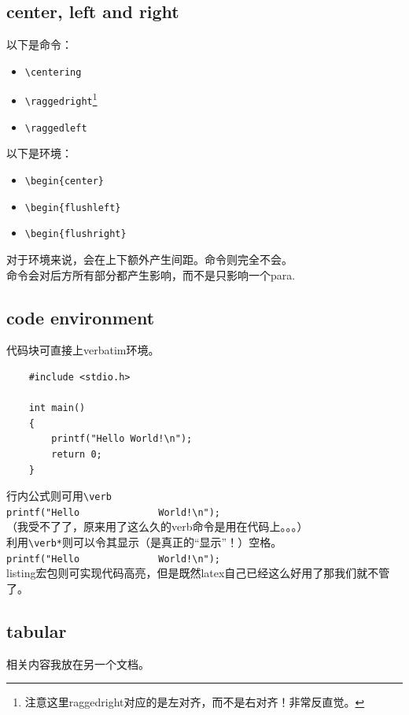 \documentclass{article}
\begin{document}
\subsection{center, left and right}
\noindent
以下是命令：
\begin{itemize}
    \item \verb|\centering|
    \item \verb|\raggedright|\footnote{注意这里raggedright对应的是左对齐，而不是右对齐！非常反直觉。}
    \item \verb|\raggedleft|
\end{itemize}
以下是环境：
\begin{itemize}
    \item \verb|\begin{center}|
    \item \verb|\begin{flushleft}|
    \item \verb|\begin{flushright}|
\end{itemize}
对于环境来说，会在上下额外产生间距。命令则完全不会。\\
命令会对后方所有部分都产生影响，而不是只影响一个para.
\subsection{code environment}
\noindent
代码块可直接上verbatim环境。
\begin{verbatim}
    #include <stdio.h>

    int main()
    {
        printf("Hello World!\n");
        return 0;
    }
\end{verbatim}
行内公式则可用\verb|\verb|\\
\verb|printf("Hello              World!\n");|\\
（我受不了了，原来用了这么久的verb命令是用在代码上。。。）\\
利用\verb|\verb*|则可以令其显示（是真正的“显示”！）空格。\\
\verb*|printf("Hello              World!\n");|\\
listing宏包则可实现代码高亮，但是既然latex自己已经这么好用了那我们就不管了。
\subsection{tabular}
\noindent
相关内容我放在另一个文档。
\end{document}
